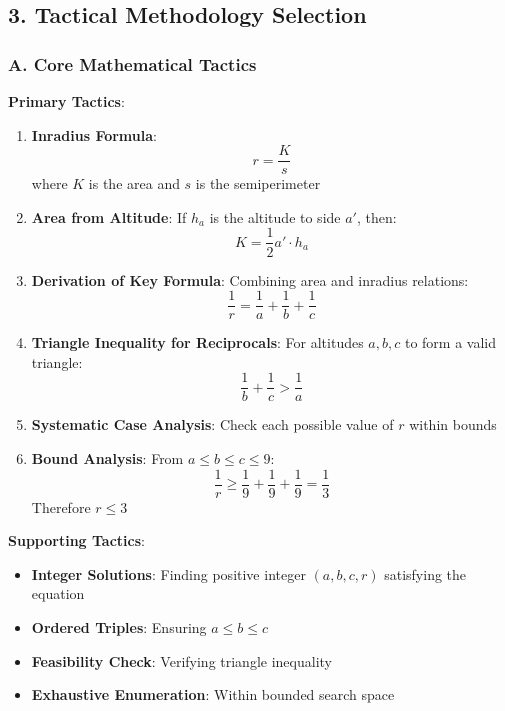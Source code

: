 \documentclass[12pt]{article}
\begin{document}
\begin{tacticalbox}
\subsection*{3. Tactical Methodology Selection}

\subsubsection*{A. Core Mathematical Tactics}

\textbf{Primary Tactics}:
\begin{enumerate}
    \item \textbf{Inradius Formula}:
    $$r = \frac{K}{s}$$
    where $K$ is the area and $s$ is the semiperimeter
    
    \item \textbf{Area from Altitude}:
    If $h_a$ is the altitude to side $a'$, then:
    $$K = \frac{1}{2} a' \cdot h_a$$
    
    \item \textbf{Derivation of Key Formula}:
    Combining area and inradius relations:
    $$\frac{1}{r} = \frac{1}{a} + \frac{1}{b} + \frac{1}{c}$$
    
    \item \textbf{Triangle Inequality for Reciprocals}:
    For altitudes $a, b, c$ to form a valid triangle:
    $$\frac{1}{b} + \frac{1}{c} > \frac{1}{a}$$
    
    \item \textbf{Systematic Case Analysis}:
    Check each possible value of $r$ within bounds
    
    \item \textbf{Bound Analysis}:
    From $a \leq b \leq c \leq 9$:
    $$\frac{1}{r} \geq \frac{1}{9} + \frac{1}{9} + \frac{1}{9} = \frac{1}{3}$$
    Therefore $r \leq 3$
\end{enumerate}

\textbf{Supporting Tactics}:
\begin{itemize}
    \item \textbf{Integer Solutions}: Finding positive integer $(a, b, c, r)$ satisfying the equation
    \item \textbf{Ordered Triples}: Ensuring $a \leq b \leq c$
    \item \textbf{Feasibility Check}: Verifying triangle inequality
    \item \textbf{Exhaustive Enumeration}: Within bounded search space
\end{itemize}


\end{tacticalbox}
\end{document}
